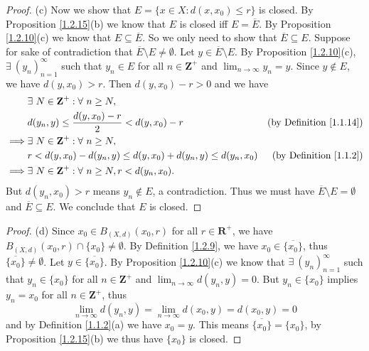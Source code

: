 \begin{proof}{(c)}
    Now we show that \(E = \{x \in X : d(x, x_0) \leq r\}\) is closed.
    By Proposition \ref{1.2.15}(b) we know that \(E\) is closed iff \(E = \overline{E}\).
    By Proposition \ref{1.2.10}(c) we know that \(E \subseteq \overline{E}\).
    So we only need to show that \(\overline{E} \subseteq E\).
    Suppose for sake of contradiction that \(\overline{E} \setminus E \neq \emptyset\).
    Let \(y \in \overline{E} \setminus E\).
    By Proposition \ref{1.2.10}(c), \(\exists\ (y_n)_{n = 1}^\infty\) such that \(y_n \in E\) for all \(n \in \mathbf{Z}^+\) and \(\lim_{n \to \infty} y_n = y\).
    Since \(y \notin E\), we have \(d(y, x_0) > r\).
    Then \(d(y, x_0) - r > 0\) and we have
    \begin{align*}
                 & \exists\ N \in \mathbf{Z}^+ : \forall\ n \geq N,                                                            \\
                 & d(y_n, y) \leq \frac{d(y, x_0) - r}{2} < d(y, x_0) - r                & \text{(by Definition \ref{1.1.14})} \\
        \implies & \exists\ N \in \mathbf{Z}^+ : \forall\ n \geq N,                                                            \\
                 & r < d(y, x_0) - d(y_n, y) \leq d(y, x_0) + d(y_n, y) \leq d(y_n, x_0) & \text{(by Definition \ref{1.1.2})}  \\
        \implies & \exists\ N \in \mathbf{Z}^+ : \forall\ n \geq N, r < d(y_n, x_0).
    \end{align*}
    But \(d(y_n, x_0) > r\) means \(y_n \notin E\), a contradiction.
    Thus we must have \(\overline{E} \setminus E = \emptyset\) and \(\overline{E} \subseteq E\).
    We conclude that \(E\) is closed.
\end{proof}

\begin{proof}{(d)}
    Since \(x_0 \in B_{(X, d)}(x_0, r)\) for all \(r \in \mathbf{R}^+\), we have \(B_{(X, d)}(x_0, r) \cap \{x_0\} \neq \emptyset\).
    By Definition \ref{1.2.9}, we have \(x_0 \in \overline{\{x_0\}}\), thus \(\overline{\{x_0\}} \neq \emptyset\).
    Let \(y \in \overline{\{x_0\}}\).
    By Proposition \ref{1.2.10}(c) we know that \(\exists\ (y_n)_{n = 1}^\infty\) such that \(y_n \in \{x_0\}\) for all \(n \in \mathbf{Z}^+\) and \(\lim_{n \to \infty} d(y_n, y) = 0\).
    But \(y_n \in \{x_0\}\) implies \(y_n = x_0\) for all \(n \in \mathbf{Z}^+\), thus
    \[
        \lim_{n \to \infty} d(y_n, y) = \lim_{n \to \infty} d(x_0, y) = d(x_0, y) = 0
    \]
    and by Definition \ref{1.1.2}(a) we have \(x_0 = y\).
    This means \(\overline{\{x_0\}} = \{x_0\}\), by Proposition \ref{1.2.15}(b) we thus have \(\{x_0\}\) is closed.
\end{proof}

